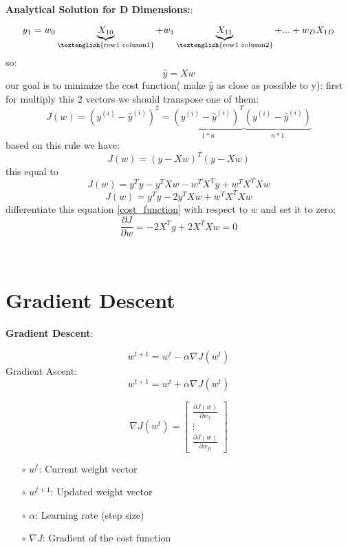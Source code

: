 \documentclass{article}
\renewcommand\text[1]{\textnormal{\textenglish{#1}}}
\newenvironment{cheatformula}[1][כותרת]{
    \begin{minipage}{\linewidth}
    \textbf{#1}:
}{
    \end{minipage}\\[2ex]
}
\begin{document}
\begin{multicols*}{2}
\begin{cheatformula}[Analytical Solution for D Dimensions:]
\begin{equation}
y_{1} = w_{0}\underbrace{X_{10}}_{\text{row1 column1}} + w_{1}\underbrace{X_{11}}_{\text{row1 column2}} + ... + w_{D}X_{1D}
\end{equation}
so: 
\begin{equation}
\widehat{y} = X w
\end{equation}
our goal is to minimize the cost function( make $\widehat{y}$ as close as possible to y):
first for multiply this 2 vectors we should transpose one of them:
\begin{equation}
J(w) =  (y^{(i)} -  \widehat{y}^{(i)})^{2} = \underbrace{(y^{(i)} - \widehat{y}^{(i)})^{T}}_{1*n} \underbrace{(y^{(i)} - \widehat{y}^{(i)})}_{n*1}
\end{equation}
based on this rule we have:
\begin{equation}
J(w) = (y - Xw)^{T}(y - Xw)
\end{equation}
this equal to
\begin{equation}
J(w) = y^{T}y - y^{T}Xw - w^{T}X^{T}y + w^{T}X^{T}Xw
\end{equation}
\begin{equation}
J(w) = y^{T}y - 2y^{T}Xw + w^{T}X^{T}Xw
\label{eq:cost_function}
\end{equation}
differentiate this equation \eqref{cost_function} with respect to $w$ and set it to zero:
$$\frac{\partial J}{\partial w} = -2X^{T}y + 2X^{T}Xw = 0$$


\end{cheatformula}

\pagebreak

\section{Gradient Descent}

\begin{cheatformula}[Gradient Descent]
$$ w^{t+1} = w^{t}-\alpha \nabla J(w^{t}) $$
Gradient Ascent:
$$ w^{t+1} = w^{t}+\alpha \nabla J(w^{t}) $$

$$\nabla J(w^{t}) = 
\begin{bmatrix}
\frac{\partial J(w)}{\partial w_{1}} \\
\vdots \\
\frac{\partial J(w)}{\partial w_{D}}
\end{bmatrix}$$

\begin{itemize}
  \item[$\circ$] $w^{t}$: Current weight vector
  \item[$\circ$] $w^{t+1}$: Updated weight vector
  \item[$\circ$] $\alpha$: Learning rate (step size)
  \item[$\circ$] $\nabla J$: Gradient of the cost function
\end{itemize}


\end{cheatformula}
\end{multicols*}
\end{document}
